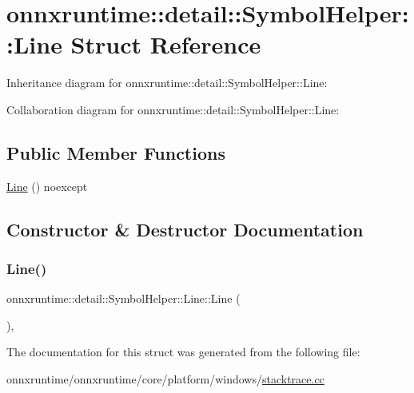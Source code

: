 \hypertarget{structonnxruntime_1_1detail_1_1SymbolHelper_1_1Line}{}\section{onnxruntime\+:\+:detail\+:\+:Symbol\+Helper\+:\+:Line Struct Reference}
\label{structonnxruntime_1_1detail_1_1SymbolHelper_1_1Line}


Inheritance diagram for onnxruntime\+:\+:detail\+:\+:Symbol\+Helper\+:\+:Line\+:


Collaboration diagram for onnxruntime\+:\+:detail\+:\+:Symbol\+Helper\+:\+:Line\+:
\subsection*{Public Member Functions}
\begin{DoxyCompactItemize}
\item 
\mbox{\hyperlink{structonnxruntime_1_1detail_1_1SymbolHelper_1_1Line_adf8310daa86f82e66be9bae484cd922d}{Line}} () noexcept
\end{DoxyCompactItemize}


\subsection{Constructor \& Destructor Documentation}
\mbox{\label{structonnxruntime_1_1detail_1_1SymbolHelper_1_1Line_adf8310daa86f82e66be9bae484cd922d}} 
\subsubsection{\texorpdfstring{Line()}{Line()}}
{\footnotesize\ttfamily onnxruntime\+::detail\+::\+Symbol\+Helper\+::\+Line\+::\+Line (\begin{DoxyParamCaption}{ }\end{DoxyParamCaption})\hspace{0.3cm}{\ttfamily [inline]}, {\ttfamily [noexcept]}}



The documentation for this struct was generated from the following file\+:\begin{DoxyCompactItemize}
\item 
onnxruntime/onnxruntime/core/platform/windows/\mbox{\hyperlink{windows_2stacktrace_8cc}{stacktrace.\+cc}}\end{DoxyCompactItemize}
